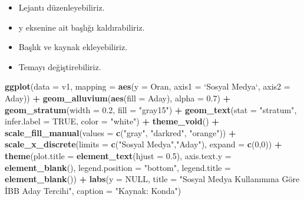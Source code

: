 \documentclass[
]{book}
\newenvironment{Shaded}{\begin{snugshade}}{\end{snugshade}}
\newcommand{\DataTypeTok}[1]{\textcolor[rgb]{0.13,0.29,0.53}{#1}}
\newcommand{\DecValTok}[1]{\textcolor[rgb]{0.00,0.00,0.81}{#1}}
\newcommand{\FloatTok}[1]{\textcolor[rgb]{0.00,0.00,0.81}{#1}}
\newcommand{\KeywordTok}[1]{\textcolor[rgb]{0.13,0.29,0.53}{\textbf{#1}}}
\newcommand{\NormalTok}[1]{#1}
\newcommand{\OperatorTok}[1]{\textcolor[rgb]{0.81,0.36,0.00}{\textbf{#1}}}
\newcommand{\OtherTok}[1]{\textcolor[rgb]{0.56,0.35,0.01}{#1}}
\newcommand{\StringTok}[1]{\textcolor[rgb]{0.31,0.60,0.02}{#1}}
\begin{document}
\begin{itemize}
\item
  Lejantı düzenleyebiliriz.
\item
  y eksenine ait başlığı kaldırabiliriz.
\item
  Başlık ve kaynak ekleyebiliriz.
\item
  Temayı değiştirebiliriz.
\end{itemize}

\begin{Shaded}
\begin{Highlighting}[]
\KeywordTok{ggplot}\NormalTok{(}\DataTypeTok{data =}\NormalTok{ v1, }\DataTypeTok{mapping =} \KeywordTok{aes}\NormalTok{(}\DataTypeTok{y =}\NormalTok{ Oran, }\DataTypeTok{axis1 =} \StringTok{`}\DataTypeTok{Sosyal Medya}\StringTok{`}\NormalTok{, }\DataTypeTok{axis2 =}\NormalTok{ Aday)) }\OperatorTok{+}
\StringTok{  }\KeywordTok{geom_alluvium}\NormalTok{(}\KeywordTok{aes}\NormalTok{(}\DataTypeTok{fill =}\NormalTok{ Aday), }\DataTypeTok{alpha =} \FloatTok{0.7}\NormalTok{) }\OperatorTok{+}
\StringTok{  }\KeywordTok{geom_stratum}\NormalTok{(}\DataTypeTok{width =} \FloatTok{0.2}\NormalTok{, }\DataTypeTok{fill =} \StringTok{"gray15"}\NormalTok{) }\OperatorTok{+}
\StringTok{  }\KeywordTok{geom_text}\NormalTok{(}\DataTypeTok{stat =} \StringTok{"stratum"}\NormalTok{, }\DataTypeTok{infer.label =} \OtherTok{TRUE}\NormalTok{, }\DataTypeTok{color =} \StringTok{"white"}\NormalTok{) }\OperatorTok{+}
\StringTok{  }\KeywordTok{theme_void}\NormalTok{() }\OperatorTok{+}
\StringTok{  }\KeywordTok{scale_fill_manual}\NormalTok{(}\DataTypeTok{values =} \KeywordTok{c}\NormalTok{(}\StringTok{"gray"}\NormalTok{, }\StringTok{"darkred"}\NormalTok{, }\StringTok{"orange"}\NormalTok{)) }\OperatorTok{+}
\StringTok{  }\KeywordTok{scale_x_discrete}\NormalTok{(}\DataTypeTok{limits =} \KeywordTok{c}\NormalTok{(}\StringTok{"Sosyal Medya"}\NormalTok{,}\StringTok{"Aday"}\NormalTok{), }\DataTypeTok{expand =} \KeywordTok{c}\NormalTok{(}\DecValTok{0}\NormalTok{,}\DecValTok{0}\NormalTok{)) }\OperatorTok{+}
\StringTok{  }\KeywordTok{theme}\NormalTok{(}\DataTypeTok{plot.title =} \KeywordTok{element_text}\NormalTok{(}\DataTypeTok{hjust =} \FloatTok{0.5}\NormalTok{),}
        \DataTypeTok{axis.text.y =} \KeywordTok{element_blank}\NormalTok{(),}
        \DataTypeTok{legend.position =} \StringTok{"bottom"}\NormalTok{,}
        \DataTypeTok{legend.title =} \KeywordTok{element_blank}\NormalTok{()) }\OperatorTok{+}
\StringTok{  }\KeywordTok{labs}\NormalTok{(}\DataTypeTok{y =} \OtherTok{NULL}\NormalTok{,}
       \DataTypeTok{title =} \StringTok{"Sosyal Medya Kullanımına Göre İBB Aday Tercihi"}\NormalTok{,}
       \DataTypeTok{caption =} \StringTok{"Kaynak: Konda"}\NormalTok{)}
\end{Highlighting}
\end{Shaded}
\end{document}
